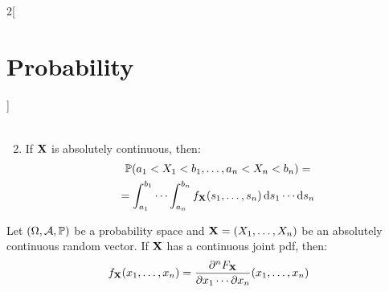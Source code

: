 \documentclass[../../../main_math.tex]{subfiles}
\begin{document}
\begin{multicols}{2}[\section{Probability}]
\begin{proposition}
\begin{enumerate}
\begin{multline*}
            \end{multline*}
      \item If $\boldsymbol{\mathrm{X}}$ is absolutely continuous, then:
            \begin{multline*}
              \mathbb{P}(a_1<X_1<b_1,\ldots,a_n<X_n<b_n)=\\=\int_{a_1}^{b_1}\cdots\int_{a_n}^{b_n} f_{\boldsymbol{\mathrm{X}}}(s_1,\ldots,s_n)\dd{s}_1\cdots\dd{s}_n
            \end{multline*}
    \end{enumerate}
  \end{proposition}
  \begin{proposition}
    Let $(\Omega,\mathcal{A},\mathbb{P})$ be a probability space and $\boldsymbol{\mathrm{X}}=(X_1,\ldots,X_n)$ be an absolutely continuous random vector. If $\boldsymbol{\mathrm{X}}$ has a continuous joint pdf, then: $$f_{\boldsymbol{\mathrm{X}}}(x_1,\ldots,x_n)=\frac{\partial^nF_{\boldsymbol{\mathrm{X}}}}{\partial x_1\cdots\partial x_n}(x_1,\ldots,x_n)$$
  \end{proposition}

\end{multicols}
\end{document}

